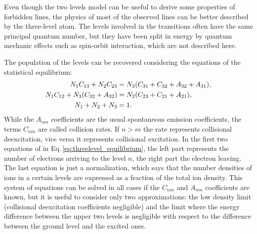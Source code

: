 \documentclass[../main.tex]{subfiles}
\begin{document}
Even though the two levels model can be useful to derive some properties of forbidden lines, the physics of most of the observed lines can be better described by the three-level atom.
The levels involved in the transitions often have the same principal quantum number, but they have been split in energy by quantum mechanic effects such as spin-orbit interaction, which are not described here.

The population of the levels can be recovered considering the equations of the statistical equilibrium:
\begin{align}
    \label{eq:threelevel_equilibrium}
    N_1 C_{13}+N_2 C_{23} &= N_3(C_{31}+C_{32}+A_{32}+A_{31}), \notag\\
    N_1 C_{12}+N_3(C_{32}+A_{32}) &= N_2(C_{23}+C_{21}+A_{21}),\\
    N_1+N_2+N_3 &= 1. \notag
\end{align}
While the $A_{nm}$ coefficients are the usual spontaneous emission coefficients, the terms $C_{nm}$ are called collision rates.
If $n>m$ the rate represents collisional deexcitation, vice versa it represents collisional excitation.
In the first two equations of in Eq.\,\ref{eq:threelevel_equilibrium}, the left part represents the number of electrons arriving to the level $n$, the right part the electron leaving.
The last equation is just a normalization, which says that the number densities of ions in a certain levels are expressed as a fraction of the total ion density.
This system of equations can be solved in all cases if the $C_{nm}$ and $A_{nm}$ coefficients are known, but it is useful to consider only two approximations: the low density limit (collisional deexcitation coefficients negligible) and the limit where the energy difference between the upper two levels is negligible with respect to the difference between the ground level and the excited ones.
\end{document}

